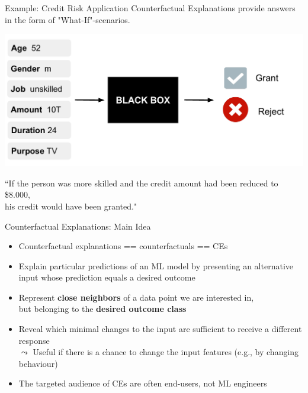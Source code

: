 \documentclass[11pt,compress,t,notes=noshow, aspectratio=169, xcolor=table]{beamer}
\begin{document}
\begin{frame}[c]{Example: Credit Risk Application}
	Counterfactual Explanations provide answers in the form of "What-If"-scenarios.
	\begin{center}\includegraphics[width=0.6\linewidth, page=2]{figure/counterfactuals_credit.pdf} \end{center}

	``If the person was more skilled and the credit amount had been reduced to \$8.000,\\ his credit would have been granted."  \\[0.2cm]

\end{frame}


\begin{frame}[c]{Counterfactual Explanations: Main Idea}
	\begin{itemize}
	    \item Counterfactual explanations == counterfactuals == CEs
	    \item Explain particular predictions of an ML model by presenting an alternative input whose prediction equals a desired outcome
		\item Represent \textbf{close neighbors} of a data point we are interested in,\\ but belonging to the \textbf{desired outcome class}
		\item Reveal which minimal changes to the input are sufficient to receive a different response\\
		$\leadsto$ Useful if there is a chance to change the input features (e.g., by changing behaviour)
		\item The targeted audience of CEs are often end-users, not ML engineers
	\end{itemize}
\end{frame}
\end{document}
